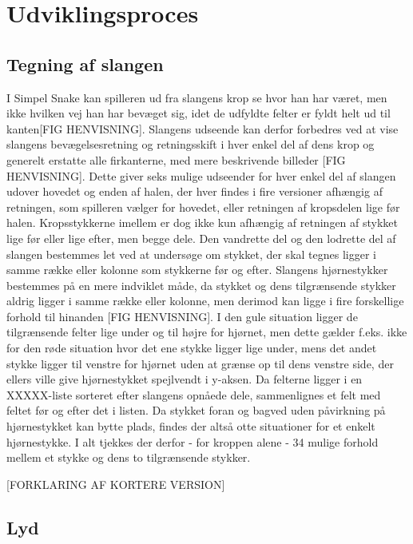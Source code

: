 \documentclass{report}
\begin{document}
\section{Udviklingsproces}

\subsection{Tegning af slangen}
I Simpel Snake kan spilleren ud fra slangens krop se hvor han har været, men ikke hvilken vej han har bevæget sig, idet de udfyldte felter er fyldt helt ud til kanten[FIG HENVISNING]. Slangens udseende kan derfor forbedres ved at vise slangens bevægelsesretning og retningsskift i hver enkel del af dens krop og generelt erstatte alle firkanterne, med mere beskrivende billeder [FIG HENVISNING]. Dette giver seks mulige udseender for hver enkel del af slangen udover hovedet og enden af halen, der hver findes i fire versioner afhængig af retningen, som spilleren vælger for hovedet, eller retningen af kropsdelen lige før halen. Kropsstykkerne imellem er dog ikke kun afhængig af retningen af stykket lige før eller lige efter, men begge dele. Den vandrette del og den lodrette del af slangen bestemmes let ved at undersøge om stykket, der skal tegnes ligger i samme række eller kolonne som stykkerne før og efter. Slangens hjørnestykker bestemmes på en mere indviklet måde, da stykket og dens tilgrænsende stykker aldrig ligger i samme række eller kolonne, men derimod kan ligge i fire forskellige forhold til hinanden [FIG HENVISNING]. I den gule situation ligger de tilgrænsende felter lige under og til højre for hjørnet, men dette gælder f.eks. ikke for den røde situation hvor det ene stykke ligger lige under, mens det andet stykke ligger til venstre for hjørnet uden at grænse op til dens venstre side, der ellers ville give hjørnestykket spejlvendt i y-aksen. Da felterne ligger i en XXXXX-liste sorteret efter slangens opnåede dele, sammenlignes et felt med feltet før og efter det i listen. Da stykket foran og bagved uden påvirkning på hjørnestykket kan bytte plads, findes der altså otte situationer for et enkelt hjørnestykke. I alt tjekkes der derfor - for kroppen alene - 34 mulige forhold mellem et stykke og dens to tilgrænsende stykker.

[FORKLARING AF KORTERE VERSION]

\subsection{Lyd}
\end{document}
